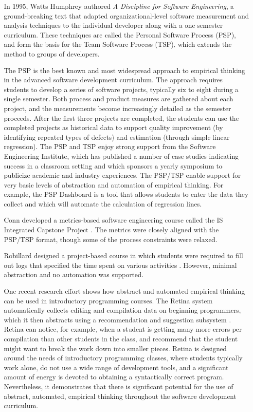 In 1995, Watts Humphrey authored {\em A Discipline for Software
Engineering}, a ground-breaking text that adapted organizational-level
software measurement and analysis techniques to the individual developer
along with a one semester curriculum. These techniques are called the
Personal Software Process (PSP), and form the basis for the Team Software
Process (TSP), which extends the method to groups of developers. 

The PSP is the best known and most widespread approach to empirical
thinking in the advanced software development curriculum.  The approach
requires students to develop a series of software projects, typically six
to eight during a single semester.  Both process and product measures are
gathered about each project, and the measurements become increasingly
detailed as the semester proceeds. After the first three projects are
completed, the students can use the completed projects as historical data
to support quality improvement (by identifying repeated types of defects)
and estimation (through simple linear regression).  The PSP and TSP enjoy
strong support from the Software Engineering Institute, which has published
a number of case studies indicating success in a classroom setting and
which sponsors a yearly symposium to publicize academic and industry
experiences.  The PSP/TSP enable support for very basic levels of
abstraction and automation of empirical thinking. For example, the PSP
Dashboard is a tool that allows students to enter the data they collect and
which will automate the calculation of regression lines.

Conn developed a metrics-based software engineering course called the 
IS Integrated Capstone Project \cite{Conn04}.  The metrics were closely aligned
with the PSP/TSP format, though some of the process constraints were relaxed. 

Robillard designed a project-based course in which students were required
to fill out logs that specified the time spent on various activities
\cite{Robillard98}.  However, minimal abstraction and no automation was supported.

One recent research effort shows how abstract and automated empirical
thinking can be used in introductory programming courses. The Retina system
automatically collects editing and compilation data on beginning
programmers, which it then abstracts using a recommendation and suggestion
subsystem \cite{Murphy09}.  Retina can notice, for example, when a student
is getting many more errors per compilation than other students in the
class, and recommend that the student might want to break the work down
into smaller pieces.  Retina is designed around the needs of introductory
programming classes, where students typically work alone, do not use a wide
range of development tools, and a significant amount of energy is devoted
to obtaining a syntactically correct program.  Nevertheless, it
demonstrates that there is significant potential for the use of abstract,
automated, empirical thinking throughout the software development
curriculum.

